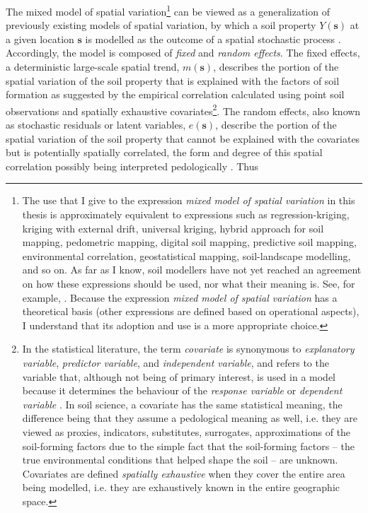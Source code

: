 The mixed model of spatial variation\footnote{The use that I give to the expression \emph{mixed model of 
spatial variation}
in this thesis is approximately equivalent to expressions such as regression-kriging, kriging with external 
drift, universal
kriging, hybrid approach for soil mapping, pedometric mapping, digital soil mapping, predictive soil mapping, 
environmental
correlation, geostatistical mapping, soil-landscape modelling, and so on. As far as I know, soil modellers have 
not yet reached an agreement on how these  expressions should be used, nor what their 
 meaning is. See, for example, . Because the 
expression \emph{mixed model of spatial variation} has a theoretical basis (other expressions are defined based 
on operational aspects), I understand that its adoption and use is a more appropriate choice.} can be viewed as 
a generalization of previously existing models of spatial variation, by which a soil property 
$Y(\boldsymbol{s})$ at a given location $\boldsymbol{s}$ is modelled as the outcome of a spatial stochastic 
process \cite{Cressie1993, HeuvelinkEtAl2001, LarkEtAl2006}. Accordingly, the model is composed of \emph{fixed} 
and \emph{random effects}. The fixed effects, a deterministic large-scale spatial trend, $m(\boldsymbol{s})$, 
describes the portion of the spatial variation of the soil property that is explained with the factors of soil 
formation as suggested by the empirical correlation calculated using point soil observations and spatially 
exhaustive covariates\footnote{In the statistical literature, the term \emph{covariate} is synonymous to 
\emph{explanatory variable}, \emph{predictor variable}, and \emph{independent variable}, and refers to the 
variable that, although not being of primary interest, is used in a model because it determines the behaviour 
of the \emph{response variable} or \emph{dependent variable} \cite{Everitt2006}. In soil science, a covariate 
has the same statistical meaning, the difference being that they assume a pedological meaning as well, i.e. 
they are viewed as proxies, indicators, substitutes, surrogates, approximations of the soil-forming factors due 
to the simple fact that the soil-forming factors -- the true environmental conditions that helped shape the 
soil -- are unknown. Covariates are defined \emph{spatially exhaustive} when they cover the entire area being 
modelled, i.e. they are exhaustively known in the entire geographic space.}. The random effects, also known as 
stochastic residuals or latent variables, $e(\boldsymbol{s})$, describe the portion of the spatial variation of 
the soil property that cannot be explained with the covariates but is potentially spatially correlated, the 
form and degree of this spatial correlation possibly being interpreted pedologically \cite{Lark2012}. Thus

